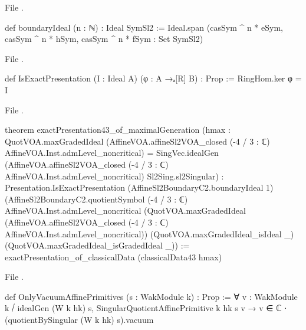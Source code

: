 \noindent File .
\begin{leancode}
def boundaryIdeal (n : ℕ) : Ideal SymSl2 :=
  Ideal.span
    ({casSym ^ n * eSym, casSym ^ n * hSym, casSym ^ n * fSym} : Set SymSl2)
\end{leancode}
\noindent File .
\begin{leancode}
def IsExactPresentation (I : Ideal A) (φ : A →ₐ[R] B) : Prop :=
  RingHom.ker φ = I
\end{leancode}
\noindent File .
\begin{leancode}
theorem exactPresentation43_of_maximalGeneration
    (hmax : QuotVOA.maxGradedIdeal
        (AffineVOA.affineSl2VOA_closed (-4 / 3 : ℂ) AffineVOA.Inst.admLevel_noncritical) =
      SingVec.idealGen
        (AffineVOA.affineSl2VOA_closed (-4 / 3 : ℂ) AffineVOA.Inst.admLevel_noncritical)
        Sl2Sing.sl2Singular) :
    Presentation.IsExactPresentation (AffineSl2BoundaryC2.boundaryIdeal 1)
      (AffineSl2BoundaryC2.quotientSymbol (-4 / 3 : ℂ) AffineVOA.Inst.admLevel_noncritical
        (QuotVOA.maxGradedIdeal
          (AffineVOA.affineSl2VOA_closed (-4 / 3 : ℂ) AffineVOA.Inst.admLevel_noncritical))
        (QuotVOA.maxGradedIdeal_isIdeal _)
        (QuotVOA.maxGradedIdeal_isGradedIdeal _)) :=
  exactPresentation_of_classicalData (classicalData43 hmax)
\end{leancode}
\noindent File .
\begin{leancode}
def OnlyVacuumAffinePrimitives (s : WakModule k) : Prop :=
  ∀ v : WakModule k ⧸ idealGen (W k hk) s,
    SingularQuotientAffinePrimitive k hk s v →
      v ∈ ℂ ∙ (quotientBySingular (W k hk) s).vacuum
\end{leancode}

